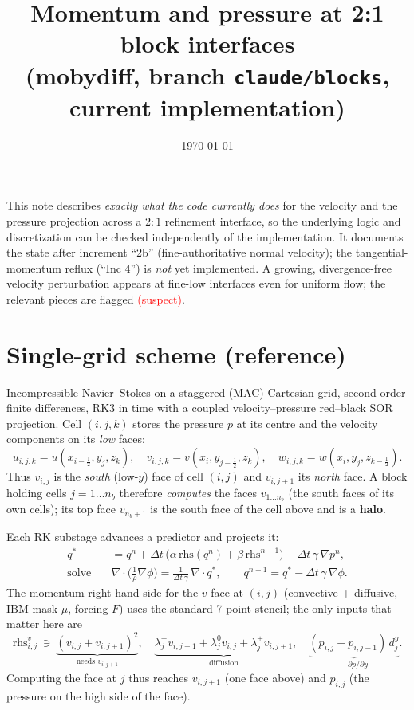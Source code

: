 \documentclass[11pt]{article}
\title{Momentum and pressure at 2:1 block interfaces\\ \large (mobydiff, branch \texttt{claude/blocks}, current implementation)}
\author{}
\date{\today}
\newcommand{\half}{\tfrac12}
\begin{document}
\maketitle

\noindent
This note describes \emph{exactly what the code currently does} for the
velocity and the pressure projection across a $2{:}1$ refinement interface,
so the underlying logic and discretization can be checked independently of
the implementation. It documents the state after increment ``2b''
(fine-authoritative normal velocity); the tangential-momentum reflux
(``Inc 4'') is \emph{not} yet implemented. A growing, divergence-free
velocity perturbation appears at fine-low interfaces even for uniform flow;
the relevant pieces are flagged \textcolor{red}{(suspect)}.

\section{Single-grid scheme (reference)}

Incompressible Navier--Stokes on a staggered (MAC) Cartesian grid,
second-order finite differences, RK3 in time with a coupled
velocity--pressure red--black SOR projection. Cell $(i,j,k)$ stores the
pressure $p$ at its centre and the velocity components on its \emph{low}
faces:
\begin{equation}
  u_{i,j,k}=u(x_{i-\half},y_j,z_k),\quad
  v_{i,j,k}=v(x_i,y_{j-\half},z_k),\quad
  w_{i,j,k}=w(x_i,y_j,z_{k-\half}).
\end{equation}
Thus $v_{i,j}$ is the \emph{south} (low-$y$) face of cell $(i,j)$ and
$v_{i,j+1}$ its \emph{north} face. A block holding cells $j=1\dots n_b$
therefore \emph{computes} the faces $v_{1\dots n_b}$ (the south faces of its
own cells); its top face $v_{n_b+1}$ is the south face of the cell above and
is a \textbf{halo}.

Each RK substage advances a predictor and projects it:
\begin{align}
  q^\ast &= q^n + \Delta t\,\big(\alpha\,\mathrm{rhs}(q^n)+\beta\,\mathrm{rhs}^{n-1}\big)-\Delta t\,\gamma\,\nabla p^n, \label{eq:pred}\\
  \text{solve}\quad &\nabla\!\cdot\!\Big(\tfrac{1}{\rho}\nabla\phi\Big)=\tfrac{1}{\Delta t\,\gamma}\,\nabla\!\cdot q^\ast, \qquad
  q^{n+1}=q^\ast-\Delta t\,\gamma\,\nabla\phi . \label{eq:proj}
\end{align}
The momentum right-hand side for the $v$ face at $(i,j)$ (convective +
diffusive, $\mathrm{IBM}$ mask $\mu$, forcing $F$) uses the standard 7-point
stencil; the only inputs that matter here are
\begin{equation}
  \mathrm{rhs}^v_{i,j}\ \ni\ \underbrace{(v_{i,j}{+}v_{i,j+1})^2}_{\text{needs }v_{i,j+1}},\quad
  \underbrace{\lambda^-_j v_{i,j-1}+\lambda^0_j v_{i,j}+\lambda^+_j v_{i,j+1}}_{\text{diffusion}},\quad
  \underbrace{(p_{i,j}-p_{i,j-1})\,d^y_j}_{-\,\partial p/\partial y}.
\end{equation}
Computing the face at $j$ thus reaches $v_{i,j+1}$ (one face above) and
$p_{i,j}$ (the pressure on the high side of the face).
\end{document}
